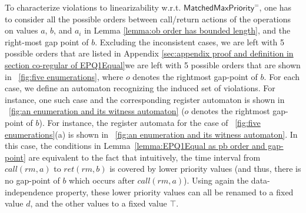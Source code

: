 \smallskip
To characterize violations to linearizability w.r.t. $\mathsf{MatchedMaxPriority}^{=}$, one has to consider all the possible orders between call/return actions of the operations on values $a$, $b$, and $a_i$ in Lemma \ref{lemma:ob order has bounded length}, and the right-most gap point of $b$. Excluding the inconsistent cases, {\color {blue}we are left with 5 possible orders that are listed in Appendix \ref{sec:appendix proof and definition in section co-regular of EPQ1Equal}}{\color {red}we are left with 5 possible orders that are shown in \figurename~\ref{fig:five enumerations}, where $o$ denotes the rightmost gap-point of $b$}.
For each case, we define an automaton recognizing the induced set of violations. {\color {blue}For instance, one such case and the corresponding register automaton is shown in \figurename~\ref{fig:an enumeration and its witness automaton} ($o$ denotes the rightmost gap-point of $b$).} {\color {red}For instance, the register automata for the case of \figurename~\ref{fig:five enumerations}(a) is shown in \figurename~\ref{fig:an enumeration and its witness automaton}.} In this case, the conditions in Lemma~\ref{lemma:EPQ1Equal as pb order and gap-point} are equivalent to the fact that intuitively, the time interval from $\textit{call}(\textit{rm},a)$ to $\textit{ret}(\textit{rm},b)$ is covered by lower priority values (and thus, there is no gap-point of $b$ which occurs after $\textit{call}(\textit{rm},a)$). Using again the data-independence property, these lower priority values can all be renamed to a fixed value $d$, and the other values to a fixed value $\top$.





